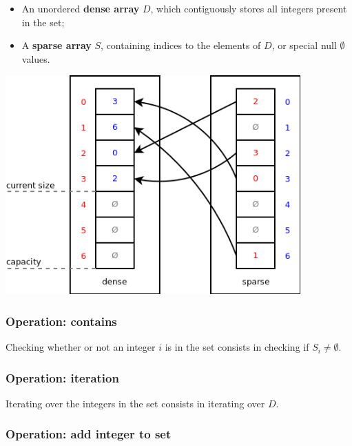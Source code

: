 \documentclass[twoside, 12pt, a4paper, openany]{book}
\let\origfigure=\figure
\let\endorigfigure=\endfigure
\renewenvironment{figure}[1][]{%
\origfigure[H]
}{%
\endorigfigure
}
\begin{document}
\begin{itemize}
\item
  An unordered \textbf{dense array} \(D\), which contiguously stores all
  integers present in the set;
\item
  A \textbf{sparse array} \(S\), containing indices to the elements of
  \(D\), or special null \(\emptyset\) values.
\end{itemize}

\begin{figure}[htbp]
\centering
\includegraphics[width=0.85000\textwidth]{source/figures/sparseset.png}
\caption{ECST miscellaneous: fixed sparse integer set
example}\label{sparsesetexample}
\end{figure}

\subsubsection{Operation: contains}\label{operation-contains}

Checking whether or not an integer \(i\) is in the set consists in
checking if \(S_i \neq \emptyset\).

\subsubsection{Operation: iteration}\label{operation-iteration}

Iterating over the integers in the set consists in iterating over \(D\).

\subsubsection{Operation: add integer to
set}\label{operation-add-integer-to-set}
\end{document}
